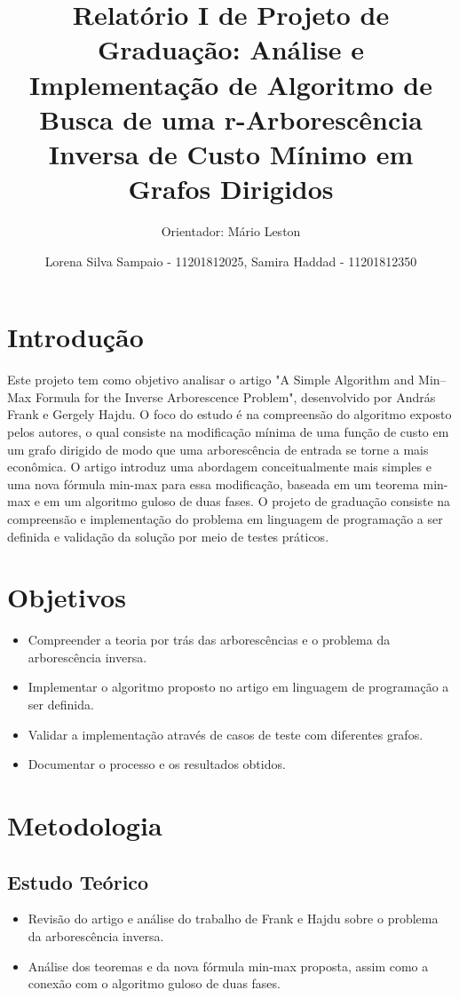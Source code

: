 \documentclass[12pt,a4paper]{article}
\title{Relatório I de Projeto de Graduação: Análise e Implementação de Algoritmo de Busca de uma r-Arborescência Inversa de Custo Mínimo em Grafos Dirigidos}
\author{Orientador: Mário Leston \and Lorena Silva Sampaio - 11201812025, Samira Haddad - 11201812350}
\date{}
\begin{document}
\maketitle

\section{Introdução}
Este projeto tem como objetivo analisar o artigo "A Simple Algorithm and Min–Max Formula for the Inverse Arborescence Problem", desenvolvido por András Frank e Gergely Hajdu. O foco do estudo é na compreensão do algoritmo exposto pelos autores, o qual consiste na modificação mínima de uma função de custo em um grafo dirigido de modo que uma arborescência de entrada se torne a mais econômica. O artigo introduz uma abordagem conceitualmente mais simples e uma nova fórmula min-max para essa modificação, baseada em um teorema min-max e em um algoritmo guloso de duas fases. O projeto de graduação consiste na compreensão e implementação do problema em linguagem de programação a ser definida e validação da solução por meio de testes práticos.

\section{Objetivos}
\begin{itemize}
    \item Compreender a teoria por trás das arborescências e o problema da arborescência inversa.
    \item Implementar o algoritmo proposto no artigo em linguagem de programação a ser definida.
    \item Validar a implementação através de casos de teste com diferentes grafos.
    \item Documentar o processo e os resultados obtidos.
\end{itemize}

\section{Metodologia}

\subsection{Estudo Teórico}
\begin{itemize}
    \item Revisão do artigo e análise do trabalho de Frank e Hajdu sobre o problema da arborescência inversa.
    \item Análise dos teoremas e da nova fórmula min-max proposta, assim como a conexão com o algoritmo guloso de duas fases.
\end{itemize}
\end{document}
